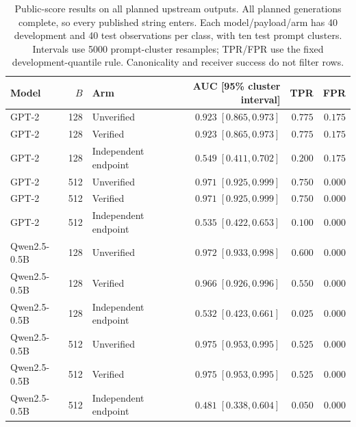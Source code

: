 \begin{table}[t]
\centering
\caption{Public-score results on all planned upstream outputs. All planned generations complete, so every published string enters. Each model/payload/arm has 40 development and 40 test observations per class, with ten test prompt clusters. Intervals use 5000 prompt-cluster resamples; TPR/FPR use the fixed development-quantile rule. Canonicality and receiver success do not filter rows.}
\label{tab:upstream-observable}
\begin{tabular}{lrlrrr}
\toprule
Model & $B$ & Arm & AUC [95\% cluster interval] & TPR & FPR \\
\midrule
GPT-2 & 128 & Unverified & $0.923\;[0.865,0.973]$ & $0.775$ & $0.175$ \\
GPT-2 & 128 & Verified & $0.923\;[0.865,0.973]$ & $0.775$ & $0.175$ \\
GPT-2 & 128 & Independent endpoint & $0.549\;[0.411,0.702]$ & $0.200$ & $0.175$ \\
GPT-2 & 512 & Unverified & $0.971\;[0.925,0.999]$ & $0.750$ & $0.000$ \\
GPT-2 & 512 & Verified & $0.971\;[0.925,0.999]$ & $0.750$ & $0.000$ \\
GPT-2 & 512 & Independent endpoint & $0.535\;[0.422,0.653]$ & $0.100$ & $0.000$ \\
\midrule
Qwen2.5-0.5B & 128 & Unverified & $0.972\;[0.933,0.998]$ & $0.600$ & $0.000$ \\
Qwen2.5-0.5B & 128 & Verified & $0.966\;[0.926,0.996]$ & $0.550$ & $0.000$ \\
Qwen2.5-0.5B & 128 & Independent endpoint & $0.532\;[0.423,0.661]$ & $0.025$ & $0.000$ \\
Qwen2.5-0.5B & 512 & Unverified & $0.975\;[0.953,0.995]$ & $0.525$ & $0.000$ \\
Qwen2.5-0.5B & 512 & Verified & $0.975\;[0.953,0.995]$ & $0.525$ & $0.000$ \\
Qwen2.5-0.5B & 512 & Independent endpoint & $0.481\;[0.338,0.604]$ & $0.050$ & $0.000$ \\
\bottomrule
\end{tabular}
\end{table}
